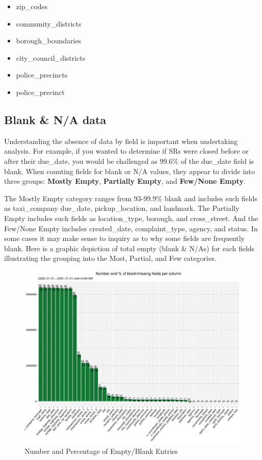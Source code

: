 \documentclass[linenumber]{jdsart}
\begin{document}
\begin{itemize}
	\item zip\_codes
	
	\item community\_districts
	
	\item borough\_boundaries
	
	\item city\_council\_districts
	
	\item police\_precincts
	
	\item police\_precinct 
\end{itemize}	

		
\subsection{Blank \& N/A data}
\label{sec:blanks}
Understanding the absence of data by field is important 
when undertaking analysis. For example, if you wanted to 
determine if SRs were closed before or after their due\_date, 
you would be challenged as 99.6\% of the due\_date field is 
blank. When counting fields for blank or N/A values, they appear 
to divide into three groups: \textbf{Mostly Empty}, \textbf{Partially Empty}, 
and \textbf{Few/None Empty}. 

The Mostly Empty category ranges from 93-99.9\% blank 
and includes such fields as taxi\_company due\_date, pickup\_location, and 
landmark. The Partially Empty includes such fields as location\_type, borough, 
and cross\_street. And the Few/None Empty includes created\_date, 
complaint\_type, agency, and status. In some cases it may make 
sense to inquiry as to why some fields are frequently blank. Here is a graphic 
depiction of total empty (blank \& N/As) for each fields illustrating
the grouping into the Most, Partial, and Few categories. 


\begin{figure}[tbp]
	\centering
  	\includegraphics[width=\textwidth]{BlankFields.pdf}
	\caption{Number and Percentage of Empty/Blank Entries}
	\label{fig:blank_fields}
\end{figure}
\end{document}
